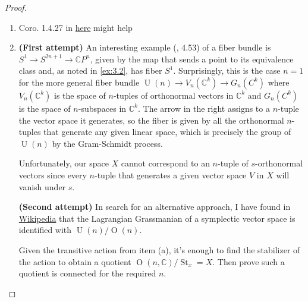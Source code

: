 \documentclass{article}
\newcommand{\C}{\mathbb{C}}
\renewcommand{\O}{\operatorname{O}}
\DeclareMathOperator{\U}{U}
\DeclareMathOperator{\St}{St}
\begin{document}
\begin{proof}\leavevmode
	\begin{enumerate}[label*=(\alph*)]
		\item {\color{red}Coro. 1.4.27 in \href{https://www.maths.ed.ac.uk/~v1ranick/papers/picctausk.pdf}{here} might help}
		\item \textbf{(First attempt)} An interesting example (\cite{hatcher}, 4.53) of a fiber bundle is $S^1\to S^{2n+1}\to\C P^n$, given by the map that sends a point to its equivalence class and, as noted in \cref{ex:3.2}, has fiber $S^1$. Surprisingly, this is the case $n=1$ for the more general fiber bundle $\U(n)\to V_n(\C^k)\to G_n(C^k)$ where $V_n(\C^k)$ is the space of $n$-tuples of orthonormal vectors in $\C^k$ and $G_n(C^k)$ is the space of $n$-subspaces in $\C^k$. The arrow in the right assigns to a $n$-tuple the vector space it generates, so the fiber is given by all the orthonormal $n$-tuples that generate any given linear space, which is precisely the group of $\U(n)$ by the Gram-Schmidt process.

		Unfortunately, our space $X$ cannot correspond to an $n$-tuple of $s$-orthonormal vectors since every $n$-tuple that generates a given vector space $V$ in $X$ will vanish under $s$.
		
		\textbf{(Second attempt)} In search for an alternative approach, I have found in \href{https://en.wikipedia.org/wiki/Lagrangian_Grassmannian#As_a_homogeneous_space}{Wikipedia} that the Lagrangian Grassmanian of a symplectic vector space is identified with $\U(n)/\O(n)$.
		
		{\color{red}Given the transitive action from item (a), it's enough to find the stabilizer of the action to obtain a quotient $\O(n,\C)/\St_x=X$. Then prove such a quotient is connected for the required $n$.}

	\end{enumerate}
\end{proof}

\printbibliography
\end{document}

